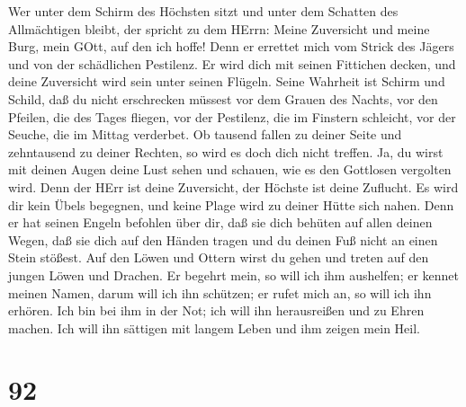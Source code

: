  Wer unter dem Schirm des Höchsten sitzt und unter dem
Schatten des Allmächtigen bleibt,  der spricht zu dem HErrn:
Meine Zuversicht und meine Burg, mein GOtt, auf den ich hoffe!
 Denn er errettet mich vom Strick des Jägers und von der
schädlichen Pestilenz.  Er wird dich mit seinen Fittichen
decken, und deine Zuversicht wird sein unter seinen Flügeln. Seine
Wahrheit ist Schirm und Schild,  daß du nicht erschrecken
müssest vor dem Grauen des Nachts, vor den Pfeilen, die des Tages
fliegen,  vor der Pestilenz, die im Finstern schleicht, vor
der Seuche, die im Mittag verderbet.  Ob tausend fallen zu
deiner Seite und zehntausend zu deiner Rechten, so wird es doch dich
nicht treffen.  Ja, du wirst mit deinen Augen deine Lust
sehen und schauen, wie es den Gottlosen vergolten wird. 
Denn der HErr ist deine Zuversicht, der Höchste ist deine Zuflucht.
 Es wird dir kein Übels begegnen, und keine Plage wird zu
deiner Hütte sich nahen.  Denn er hat seinen Engeln
befohlen über dir, daß sie dich behüten auf allen deinen Wegen,
 daß sie dich auf den Händen tragen und du deinen Fuß nicht
an einen Stein stößest.  Auf den Löwen und Ottern wirst du
gehen und treten auf den jungen Löwen und Drachen.  Er
begehrt mein, so will ich ihm aushelfen; er kennet meinen Namen, darum
will ich ihn schützen;  er rufet mich an, so will ich ihn
erhören. Ich bin bei ihm in der Not; ich will ihn herausreißen und zu
Ehren machen.  Ich will ihn sättigen mit langem Leben und
ihm zeigen mein Heil.

\hypertarget{section-91}{%
\section{92}\label{section-91}}

